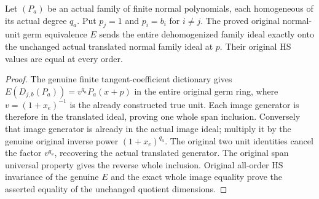 \begin{theorem}
\label{hir:actual-normal-unit-dehomogenized-family-image}
Let $(P_a)$ be an actual family of finite normal polynomials, each
homogeneous of its actual degree $q_a$. Put $p_j=1$ and $p_i=b_i$
for $i\ne j$. The proved original normal-unit germ equivalence $E$
sends the entire dehomogenized family ideal exactly onto the unchanged
actual translated normal family ideal at $p$. Their original HS values
are equal at every order.
\leanok
\end{theorem}
\begin{proof}
The genuine finite tangent-coefficient dictionary gives
$E(D_{j,b}(P_a))=v^{q_a}P_a(x+p)$ in the entire original germ ring,
where $v=(1+x_e)^{-1}$ is the already constructed true unit.
Each image generator is therefore in the translated ideal, proving
one whole span inclusion. Conversely that image generator is already
in the actual image ideal; multiply it by the genuine original inverse
power $(1+x_e)^{q_a}$. The original two unit identities cancel the
factor $v^{q_a}$, recovering the actual translated generator.
The original span universal property gives the reverse whole
inclusion. Original all-order HS invariance of the genuine $E$ and
the exact whole image equality prove the asserted equality of the
unchanged quotient dimensions.
\end{proof}

